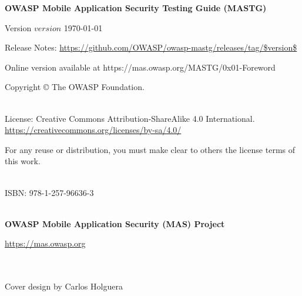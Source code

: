 \thispagestyle{empty} %

\textbf{OWASP Mobile Application Security Testing Guide (MASTG)}

Version $version$ \today

Release Notes: \url{https://github.com/OWASP/owasp-mastg/releases/tag/$version$}

Online version available at https://mas.owasp.org/MASTG/0x01-Foreword

Copyright © The OWASP Foundation. 

\\

License: Creative Commons Attribution-ShareAlike 4.0 International.
\url{https://creativecommons.org/licenses/by-sa/4.0/}

For any reuse or distribution, you must make clear to others the license terms of this work.

\\

ISBN: 978-1-257-96636-3 

\\

\textbf{OWASP Mobile Application Security (MAS) Project}

\url{https://mas.owasp.org}

\\
\\

Cover design by Carlos Holguera
